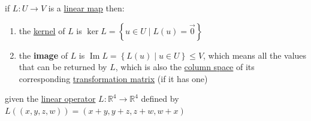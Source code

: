\documentclass[a4paper,12pt]{article}
\DeclareMathOperator{\img}{Im}
\begin{document}
\begin{definition}
\begin{lemma}
if \(L: U \to V\) is a \hyperref[sec:orgdf3d063]{linear map} then:\\
\begin{enumerate}
\item the \hyperref[sec:org975ee65]{kernel} of \(L\) is \(\ker L = \left\{u \in U \mid L(u) = \vec0\right\}\)\\
\item the \textbf{image} of \(L\) is \(\img L = \left\{L(u) \mid u \in U\right\} \le V\), which means all the values that can be returned by \(L\), which is also the \hyperref[sec:org05b7955]{column space} of its corresponding \hyperref[sec:orgda83b79]{transformation matrix} (if it has one)\\
\end{enumerate}
\end{lemma}

\begin{question}
given the \hyperref[sec:orgdf3d063]{linear operator} \(L: \mathbb{R}^4 \to \mathbb{R}^4\) defined by \(L((x,y,z,w)) = (x+y, y+z, z+w, w+x)\)\\


\end{question}
\end{definition}
\end{document}

